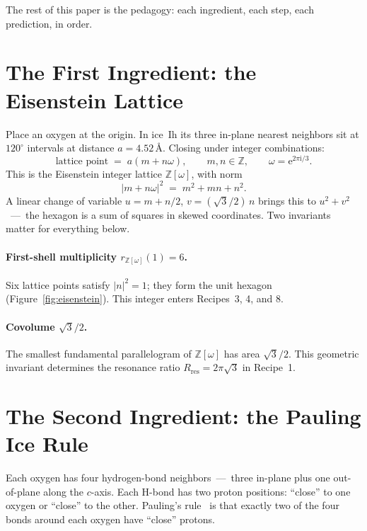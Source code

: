 \documentclass[final]{siamltex}
\newcommand{\Z}{\mathbb{Z}}
\newcommand{\e}{\mathrm{e}}
\newcommand{\Eisenstein}{\mathbb{Z}[\omega]}
\newcommand{\Rres}{R_{\text{res}}}
\begin{document}
The rest of this paper is the pedagogy: each ingredient, each
step, each prediction, in order.

\section{The First Ingredient: the Eisenstein Lattice}

Place an oxygen at the origin.  In ice~Ih its three in-plane
nearest neighbors sit at $120^{\circ}$ intervals at distance
$a = 4.52$\,{\AA}.  Closing under integer combinations:
\[
\text{lattice point} \;=\; a (m + n\omega), \qquad m, n \in \Z,
\qquad \omega = \e^{2\pi\mathrm{i}/3}.
\]
This is the Eisenstein integer lattice $\Eisenstein$, with norm
\[
|m + n\omega|^2 \;=\; m^2 + mn + n^2.
\]
A linear change of variable $u = m + n/2$, $v = (\sqrt{3}/2)\,n$
brings this to $u^2 + v^2$~---~the hexagon is a sum of squares in
skewed coordinates.  Two invariants matter for everything below.

\paragraph{First-shell multiplicity $r_{\Eisenstein}(1) = 6$.}  Six
lattice points satisfy $|n|^2 = 1$; they form the unit hexagon
(Figure~\ref{fig:eisenstein}).  This integer enters
Recipes~3, 4, and 8.

\paragraph{Covolume $\sqrt{3}/2$.}  The smallest fundamental
parallelogram of $\Eisenstein$ has area $\sqrt{3}/2$.  This
geometric invariant determines the resonance ratio
$\Rres = 2\pi\sqrt{3}$ in Recipe~1.

\section{The Second Ingredient: the Pauling Ice Rule}

Each oxygen has four hydrogen-bond neighbors~---~three in-plane
plus one out-of-plane along the $c$-axis.  Each H-bond has two
proton positions: ``close'' to one oxygen or ``close'' to the
other.  Pauling's rule~\cite{Pauling1935} is that exactly two of
the four bonds around each oxygen have ``close'' protons.
\end{document}
